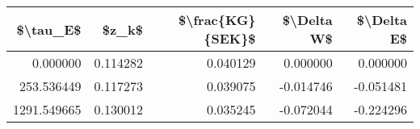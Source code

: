 \begin{tabular}{rrrrr}
\toprule
   \$\textbackslash tau\_E\$ &    \$z\_k\$ &  \$\textbackslash frac\{KG\}\{SEK\}\$ &  \$\textbackslash Delta W\$ &  \$\textbackslash Delta E\$ \\
\midrule
   0.000000 & 0.114282 &          0.040129 &    0.000000 &    0.000000 \\
 253.536449 & 0.117273 &          0.039075 &   -0.014746 &   -0.051481 \\
1291.549665 & 0.130012 &          0.035245 &   -0.072044 &   -0.224296 \\
\bottomrule
\end{tabular}
